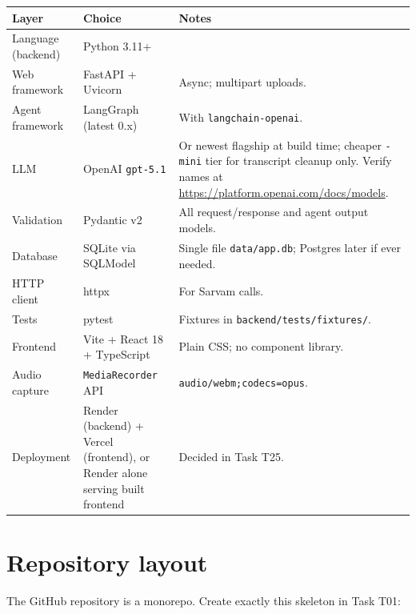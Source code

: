 \documentclass[11pt]{article}
\newcommand{\code}[1]{\texttt{#1}}
\begin{document}
\begin{center}
\begin{tabular}{p{3.4cm} p{4.6cm} p{5.6cm}}
\toprule
\textbf{Layer} & \textbf{Choice} & \textbf{Notes} \\
\midrule
Language (backend) & Python 3.11+ & \\
Web framework & FastAPI + Uvicorn & Async; multipart uploads. \\
Agent framework & LangGraph (latest 0.x) & With \code{langchain-openai}. \\
LLM & OpenAI \code{gpt-5.1} & Or newest flagship at build time; cheaper \code{-mini} tier for transcript cleanup only. Verify names at \url{https://platform.openai.com/docs/models}. \\
Validation & Pydantic v2 & All request/response and agent output models. \\
Database & SQLite via SQLModel & Single file \code{data/app.db}; Postgres later if ever needed. \\
HTTP client & httpx & For Sarvam calls. \\
Tests & pytest & Fixtures in \code{backend/tests/fixtures/}. \\
Frontend & Vite + React 18 + TypeScript & Plain CSS; no component library. \\
Audio capture & \code{MediaRecorder} API & \code{audio/webm;codecs=opus}. \\
Deployment & Render (backend) + Vercel (frontend), or Render alone serving built frontend & Decided in Task T25. \\
\bottomrule
\end{tabular}
\end{center}

\section{Repository layout}

The GitHub repository is a monorepo. Create exactly this skeleton in Task T01:
\end{document}
